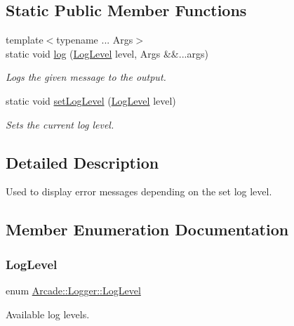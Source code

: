 \subsection*{Static Public Member Functions}
\begin{DoxyCompactItemize}
\item 
{\footnotesize template$<$typename ... Args$>$ }\\static void \mbox{\hyperlink{classArcade_1_1Logger_aeb95c0e88e1d1b0df97006a04fd5a011}{log}} (\mbox{\hyperlink{classArcade_1_1Logger_a9b6365ec3dfe94ac7d296ad60d4b3b20}{Log\+Level}} level, Args \&\&...args)
\begin{DoxyCompactList}\small\item\em Logs the given message to the output. \end{DoxyCompactList}\item 
static void \mbox{\hyperlink{classArcade_1_1Logger_a60d1ef9de9500d0864fca8f571e062e5}{set\+Log\+Level}} (\mbox{\hyperlink{classArcade_1_1Logger_a9b6365ec3dfe94ac7d296ad60d4b3b20}{Log\+Level}} level)
\begin{DoxyCompactList}\small\item\em Sets the current log level. \end{DoxyCompactList}\end{DoxyCompactItemize}


\subsection{Detailed Description}
Used to display error messages depending on the set log level. 

\subsection{Member Enumeration Documentation}
\mbox{\label{classArcade_1_1Logger_a9b6365ec3dfe94ac7d296ad60d4b3b20}} 
\subsubsection{\texorpdfstring{LogLevel}{LogLevel}}
{\footnotesize\ttfamily enum \mbox{\hyperlink{classArcade_1_1Logger_a9b6365ec3dfe94ac7d296ad60d4b3b20}{Arcade\+::\+Logger\+::\+Log\+Level}}}



Available log levels. 

